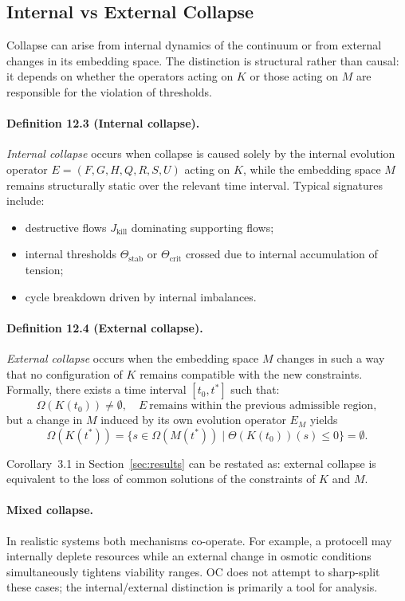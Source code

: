 \subsection{Internal vs External Collapse}

Collapse can arise from internal dynamics of the continuum or from external
changes in its embedding space. The distinction is structural rather than
causal: it depends on whether the operators acting on \(K\) or those acting on
\(M\) are responsible for the violation of thresholds.

\paragraph{Definition 12.3 (Internal collapse).}
\emph{Internal collapse} occurs when collapse is caused solely by the internal
evolution operator \(E=(F,G,H,Q,R,S,U)\) acting on \(K\), while the embedding
space \(M\) remains structurally static over the relevant time interval.
Typical signatures include:
\begin{itemize}
  \item destructive flows \(J_{\mathrm{kill}}\) dominating supporting flows;
  \item internal thresholds \(\Theta_{\mathrm{stab}}\) or
        \(\Theta_{\mathrm{crit}}\) crossed due to internal accumulation of
        tension;
  \item cycle breakdown driven by internal imbalances.
\end{itemize}

\paragraph{Definition 12.4 (External collapse).}
\emph{External collapse} occurs when the embedding space \(M\) changes in such
a way that no configuration of \(K\) remains compatible with the new
constraints. Formally, there exists a time interval \([t_0,t^{\ast}]\) such
that:
\[
  \Omega(K(t_0))\neq\emptyset,
  \quad
  E\ \text{remains within the previous admissible region},
\]
but a change in \(M\) induced by its own evolution operator \(E_M\) yields
\[
  \Omega(K(t^{\ast})) =
    \big\{ s \in \Omega(M(t^{\ast})) \mid
           \Theta(K(t_0))(s)\le 0 \big\} = \emptyset.
\]

Corollary~3.1 in Section~\ref{sec:results} can be restated as:
external collapse is equivalent to the loss of common solutions of the
constraints of \(K\) and \(M\).

\paragraph{Mixed collapse.}
In realistic systems both mechanisms co-operate. For example, a protocell
may internally deplete resources while an external change in osmotic
conditions simultaneously tightens viability ranges. OC does not attempt to
sharp-split these cases; the internal/external distinction is primarily a
tool for analysis.


